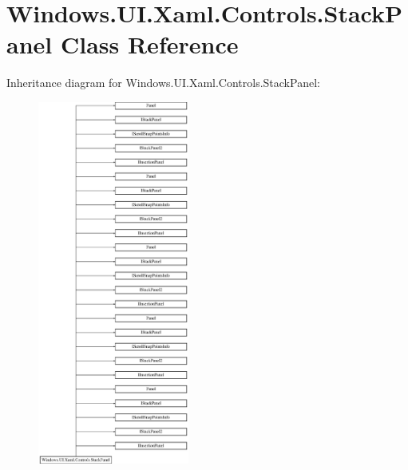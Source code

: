 \hypertarget{class_windows_1_1_u_i_1_1_xaml_1_1_controls_1_1_stack_panel}{}\section{Windows.\+U\+I.\+Xaml.\+Controls.\+Stack\+Panel Class Reference}
\label{class_windows_1_1_u_i_1_1_xaml_1_1_controls_1_1_stack_panel}
Inheritance diagram for Windows.\+U\+I.\+Xaml.\+Controls.\+Stack\+Panel\+:\begin{figure}[H]
\begin{center}
\leavevmode
\includegraphics[height=12.000000cm]{class_windows_1_1_u_i_1_1_xaml_1_1_controls_1_1_stack_panel}
\end{center}
\end{figure}
